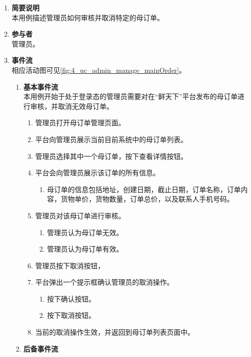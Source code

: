\begin{enumerate}
	\item \textbf{简要说明}  \\ 本用例描述管理员如何审核并取消特定的母订单。
	\item \textbf{参与者} \\ 管理员。
	\item \textbf{事件流} \\ 相应活动图可见\autoref{fig:4_uc_admin_manage_mainOrder}。
	\begin{enumerate} 
        \item \textbf{基本事件流} \\ 本用例开始于处于登录态的管理员需要对在“鲜天下”平台发布的母订单进行审核，并取消无效母订单。
        \begin{enumerate}
            \item 管理员打开母订单管理页面。
            \item 平台向管理员展示当前目前系统中的母订单列表。
            \item 管理员选择其中一个母订单，按下查看详情按钮。
            \item 平台会向管理员展示该订单的所有信息。
            \begin{enumerate}
                \item 母订单的信息包括地址，创建日期，截止日期，订单名称，订单内容，货物单价，货物数量，订单总价，以及联系人手机号码。
            \end{enumerate}
            \item 管理员对该母订单进行审核。
            \begin{enumerate}
                \item 管理员认为母订单无效。
                \item 管理员认为母订单有效。
            \end{enumerate}
            \item 管理员按下取消按钮，
            \item 平台弹出一个提示框确认管理员的取消操作。
            \begin{enumerate}
                \item 按下确认按钮。
                \item 按下取消按钮。
            \end{enumerate}
            \item 当前的取消操作生效，并返回到母订单列表页面中。
        \end{enumerate}
        \item \textbf{后备事件流}

\end{enumerate}
\end{enumerate}
